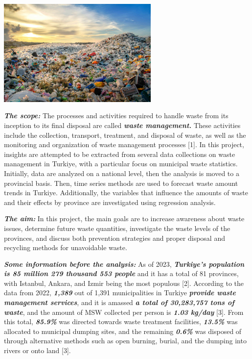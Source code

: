\documentclass[
  11pt,
  a4paper,
  DIV=11,
  numbers=noendperiod]{scrartcl}
\begin{document}
\begin{center}
\includegraphics[width=3.125in,height=\textheight]{assets/images/landfill-scaled.jpg}
\end{center}

\textbf{\emph{The scope:}} The processes and activities required to
handle waste from its inception to its final disposal are called
\textbf{\emph{waste management.}} These activities include the
collection, transport, treatment, and disposal of waste, as well as the
monitoring and organization of waste management processes {[}1{]}. In
this project, insights are attempted to be extracted from several data
collections on waste management in Turkiye, with a particular focus on
municipal waste statistics. Initially, data are analyzed on a national
level, then the analysis is moved to a provincial basis. Then, time
series methods are used to forecast waste amount trends in Turkiye.
Additionally, the variables that influence the amounts of waste and
their effects by province are investigated using regression analysis.

\textbf{\emph{The aim:}} In this project, the main goals are to increase
awareness about waste issues, determine future waste quantities,
investigate the waste levels of the provinces, and discuss both
prevention strategies and proper disposal and recycling methods for
unavoidable waste.

\textbf{\emph{Some information before the analysis:}} As of 2023,
\textbf{\emph{Turkiye's population is 85 million 279 thousand 553
people}} and it has a total of 81 provinces, with Istanbul, Ankara, and
Izmir being the most populous {[}2{]}. According to the data from 2022,
\textbf{\emph{1,389}} out of 1,391 municipalities in Turkiye
\textbf{\emph{provide waste management services}}, and it is amassed
\textbf{\emph{a total of 30,283,757 tons of waste}}, and the amount of
MSW collected per person is \textbf{\emph{1.03 kg/day}} {[}3{]}. From
this total, \textbf{\emph{85.9\%}} was directed towards waste treatment
facilities, \textbf{\emph{13.5\%}} was allocated to municipal dumping
sites, and the remaining \textbf{\emph{0.6\%}} was disposed of through
alternative methods such as open burning, burial, and the dumping into
rivers or onto land {[}3{]}.
\end{document}
